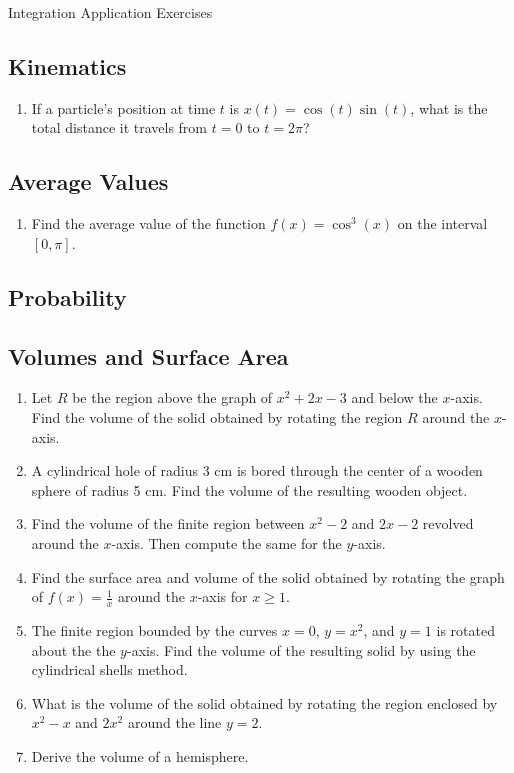 \documentclass{article}
\begin{document}
\begin{center}
\begin{Huge}Integration Application Exercises\end{Huge}
\end{center}


\subsection{Kinematics}
\begin{enumerate}
\item If a particle's position at time $t$ is $x(t)=\cos(t)\sin(t)$, what is the total distance it travels from $t=0$ to $t=2\pi$?
\end{enumerate}


\subsection{Average Values}
\begin{enumerate}
\item Find the average value of the function $f(x) = \cos^3(x)$ on the interval $[0,\pi]$.

\end{enumerate}

\subsection{Probability}

\subsection{Volumes and Surface Area}
\begin{enumerate}
\item Let $R$ be the region above the graph of $x^2+2x-3$ and below the $x$-axis. Find the volume of the solid obtained by rotating the region $R$ around the $x$-axis.
\item A cylindrical hole of radius 3 cm is bored through the center of a wooden sphere of radius 5 cm. Find the volume of the resulting wooden object.
\item Find the volume of the finite region between $x^2-2$ and $2x-2$ revolved around the $x$-axis. Then compute the same for the $y$-axis.
\item Find the surface area and volume of the solid obtained by rotating the graph of $f(x)=\frac{1}{x}$ around the $x$-axis for $x\geq1$.
\item The finite region bounded by the curves $x = 0$, $y = x^2$, and $y = 1$ is rotated about the the $y$-axis. Find the volume of the resulting solid by using the cylindrical shells method.
\item What is the volume of the solid obtained by rotating the region enclosed by $x^2-x$ and $2x^2$ around the line $y=2$.
\item Derive the volume of a hemisphere.
\end{enumerate}
\end{document}
